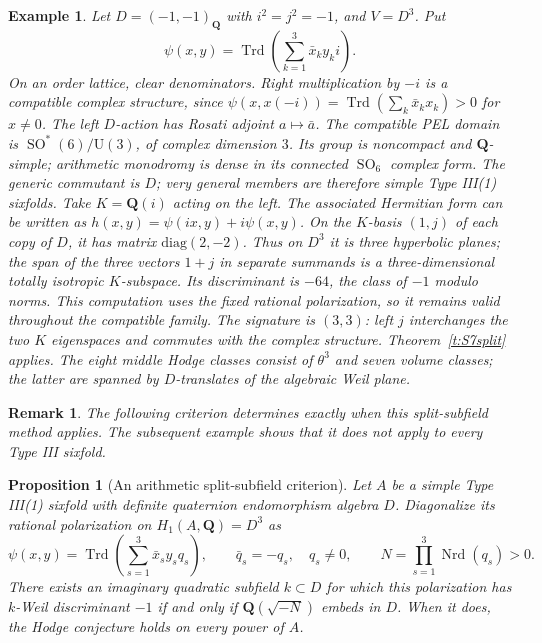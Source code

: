 \documentclass[10pt,reqno]{article}
\theoremstyle{emphasizedplain}
\newtheorem{proposition}[theorem]{Proposition}
\theoremstyle{emphasizeddefinition}
\newtheorem{example}[theorem]{Example}
\theoremstyle{emphasizeddefinition}
\newtheorem{remark}[theorem]{Remark}
\DeclareMathOperator{\SO}{SO}
\DeclareMathOperator{\Trd}{Trd}
\newcommand{\Q}{\mathbf Q}
\begin{document}
\begin{example}\label{ex:hamilton}
Let $D=(-1,-1)_\Q$ with $i^2=j^2=-1$, and $V=D^3$. Put
\[
 \psi(x,y)=\Trd\left(\sum_{k=1}^3\bar x_k y_k i\right).
\]
On an order lattice, clear denominators. Right multiplication by $-i$ is
a compatible complex structure, since
$\psi(x,x(-i))=\Trd(\sum_k\bar x_kx_k)>0$ for $x\ne0$.
The left $D$-action has Rosati adjoint $a\mapsto\bar a$.
The compatible PEL domain is $\SO^*(6)/\mathrm U(3)$, of complex dimension
$3$. Its group is noncompact and $\Q$-simple; arithmetic monodromy is dense
in its connected $\SO_6$ complex form. The generic commutant is $D$;
very general members are therefore simple Type III(1) sixfolds.
Take $K=\Q(i)$ acting on the left. The associated Hermitian form can be
written as $h(x,y)=\psi(ix,y)+i\psi(x,y)$. On the $K$-basis $(1,j)$ of
each copy of $D$, it has matrix $\mathrm{diag}(2,-2)$.
Thus on $D^3$ it is three hyperbolic planes; the span of the three vectors
$1+j$ in separate summands is a three-dimensional totally isotropic
$K$-subspace. Its discriminant is $-64$, the class of $-1$ modulo norms.
This computation uses the fixed rational polarization, so it remains valid
throughout the compatible family. The signature is $(3,3)$: left $j$
interchanges the two $K$ eigenspaces and commutes with the complex
structure. Theorem~\ref{t:S7split} applies. The eight middle Hodge classes
consist of $\theta^3$ and seven volume classes; the latter are spanned by
$D$-translates of the algebraic Weil plane.
\end{example}
\begin{remark}
The following criterion determines exactly when this split-subfield
method applies. The subsequent example shows that it does not apply
to every Type III sixfold.
\end{remark}
\begin{proposition}[An arithmetic split-subfield criterion]
\label{p:quaternion-split-test}
Let $A$ be a simple Type III(1) sixfold with definite quaternion
endomorphism algebra $D$. Diagonalize its rational polarization on
$H_1(A,\Q)=D^3$ as
\[
 \psi(x,y)=\Trd\!\left(\sum_{s=1}^3\bar x_s y_s q_s\right),
 \qquad \bar q_s=-q_s,\quad q_s\ne0,
 \qquad N=\prod_{s=1}^3\operatorname{Nrd}(q_s)>0.
\]
There exists an imaginary quadratic subfield $k\subset D$ for which
this polarization has $k$-Weil discriminant $-1$ if and only if
$\Q(\sqrt{-N})$ embeds in $D$. When it does, the Hodge conjecture
holds on every power of $A$.
\end{proposition}
\end{document}

